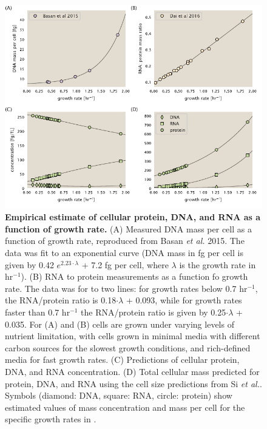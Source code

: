 \begin{figure}
		\centering
    \includegraphics[width=1\textwidth]{SI_figs/schmidt_estimate_protein_RNA_DNA_corrections.pdf}
  \caption{{\bf Empirical estimate of cellular protein, DNA, and RNA as a
  function of growth rate.} (A) Measured DNA mass per cell as a function of
  growth rate, reproduced from Basan \textit{et al.} 2015. The data was fit to
  an exponential curve (DNA mass in fg per cell is given by 0.42 $e^{2.23 \cdot
  \lambda}$ + 7.2 fg per cell, where $\lambda$ is the growth rate in hr$^{-1}$).
  (B) RNA to protein measurements as a function fo growth rate. The data was for
  to two lines: for growth rates below 0.7 hr$^{-1}$, the RNA/protein ratio is
  0.18$\cdot \lambda$ + 0.093, while for growth rates faster than 0.7 hr$^{-1}$
  the RNA/protein ratio is given by 0.25$\cdot \lambda$ + 0.035. For (A) and (B)
  cells are grown under varying levels of nutrient limitation, with cells grown
  in minimal media with different carbon sources for the slowest growth
  conditions, and rich-defined media for fast growth rates. (C) Predictions of
  cellular protein, DNA, and RNA concentration.  (D) Total cellular mass
  predicted for protein, DNA, and RNA using the cell size predictions from Si
  \textit{et al.}. Symbols (diamond: DNA, square: RNA, circle: protein)
	show estimated values of mass concentration and mass per cell for the specific
	growth rates in \cite{schmidt_2016}.
	 	}
  \label{fig:schmidt_adjustment_varying_conc}
\end{figure}
